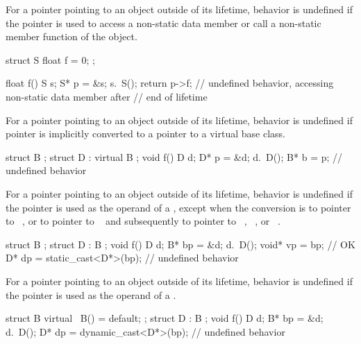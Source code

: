 \pnum
{}
For a pointer pointing to an object outside of its lifetime, behavior is
undefined if the pointer is used to access a non-static data member or call a
non-static member function of the object.

\pnum
\begin{example}
\begin{codeblock}
struct S {
  float f = 0;
};

float f() {
  S s;
  S* p = &s;
  s.~S();
  return p->f;  // undefined behavior, accessing non-static data member after
                // end of lifetime
}
\end{codeblock}
\end{example}

\pnum
{}
For a pointer pointing to an object outside of its lifetime, behavior is
undefined if pointer is implicitly converted to a pointer
to a virtual base class.

\pnum
\begin{example}
\begin{codeblock}
struct B {};
struct D : virtual B {};
void f() {
  D d;
  D* p = &d;
  d.~D();
  B* b = p;     // undefined behavior
}
\end{codeblock}
\end{example}

\pnum
{}
For a pointer pointing to an object outside of its lifetime, behavior is
undefined if the pointer is used as the operand of a
, except when the conversion
is to pointer to \cv{}~, or to pointer to \cv{}~
and subsequently to pointer to
\cv{}~,
\cv{}~, or
\cv{}~.

\pnum
\begin{example}
\begin{codeblock}
struct B {};
struct D : B {};
void f()
{
  D d;
  B* bp = &d;
  d.~D();
  void* vp = bp;                // OK
  D* dp = static_cast<D*>(bp);  // undefined behavior
}
\end{codeblock}
\end{example}

\pnum
{}
For a pointer pointing to an object outside of its lifetime, behavior is
undefined if the pointer is used as the operand of a
.

\pnum
\begin{example}
\begin{codeblock}
struct B { virtual ~B() = default; };
struct D : B {};
void f()
{
  D d;
  B* bp = &d;
  d.~D();
  D* dp = dynamic_cast<D*>(bp);     // undefined behavior
}
\end{codeblock}
\end{example}

